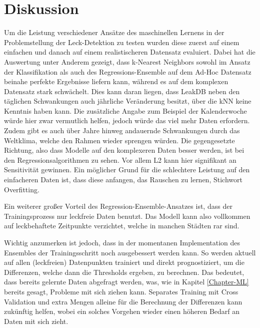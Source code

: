 \chapter{Diskussion \label{Chapter-Discussion}}

Um die Leistung verschiedener Ansätze des maschinellen Lernens in der Problemstellung der Leck-Detektion zu
 testen wurden diese zuerst auf einem einfachen und danach auf einem realistischeren Datensatz evaluiert. Dabei
 hat die Auswertung unter Anderem gezeigt, dass k-Nearest Neighbors sowohl im Ansatz der Klassifikation als auch
 des Regressions-Ensemble auf dem Ad-Hoc Datensatz beinahe perfekte Ergebnisse liefern kann, während es auf dem
 komplexen Datensatz stark schwächelt. Dies kann daran liegen, dass LeakDB neben den täglichen Schwankungen
 auch jährliche Veränderung besitzt, über die kNN keine Kenntnis haben kann. Die zusätzliche Angabe zum Beispiel
 der Kalenderwoche würde hier zwar vermutlich helfen, jedoch würde das viel mehr Daten erfordern. Zudem gibt es
 auch über Jahre hinweg andauernde Schwankungen durch das Weltklima, welche den Rahmen wieder sprengen würden.
 Die gegengesetzte Richtung, also dass Modelle auf den komplexeren Daten besser werden, ist bei den
 Regressionsalgorithmen zu sehen. Vor allem L2 kann hier signifikant an Sensitivität gewinnen. Ein möglicher
 Grund für die schlechtere Leistung auf den einfacheren Daten ist, dass diese anfangen, das Rauschen zu lernen,
 Stichwort Overfitting.

Ein weiterer großer Vorteil des Regression-Ensemble-Ansatzes ist, dass der Trainingsprozess nur leckfreie Daten
 benutzt. Das Modell kann also vollkommen auf leckbehaftete Zeitpunkte verzichtet, welche in manchen Städten rar
 sind.

Wichtig anzumerken ist jedoch, dass in der momentanen Implementation des Ensembles der Trainingsschritt noch
 ausgebessert werden kann. So werden aktuell auf allen (leckfreien) Datenpunkten trainiert und direkt
 prognostiziert, um die Differenzen, welche dann die Thresholds ergeben, zu berechnen. Das bedeutet, dass
 bereits gelernte Daten abgefragt werden, was, wie in Kapitel \ref{Chapter-ML} bereits gesagt, Probleme mit sich ziehen kann.
 Separates Training mit Cross Validation und extra Mengen alleine für die Berechnung der Differenzen kann
 zukünftig helfen, wobei ein solches Vorgehen wieder einen höheren Bedarf an Daten mit sich zieht.

